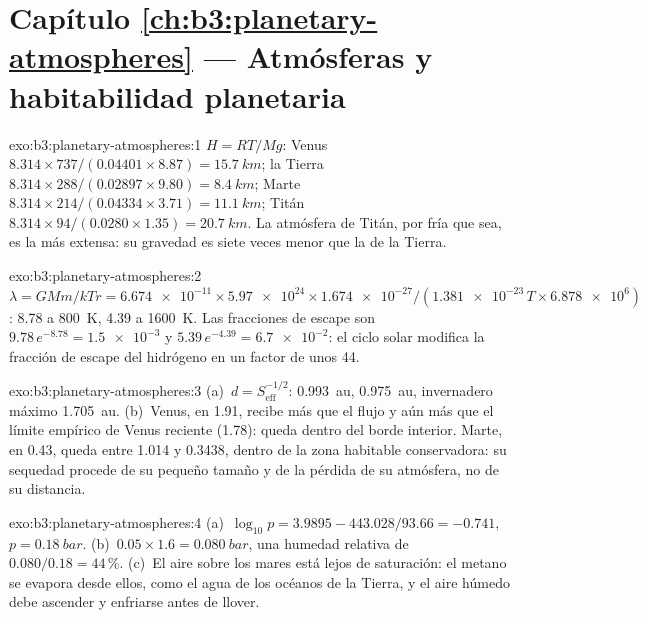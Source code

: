 \section*{Capítulo \ref{ch:b3:planetary-atmospheres} --- Atmósferas y habitabilidad planetaria}

\begin{solution}{exo:b3:planetary-atmospheres:1}
$H = RT/Mg$: Venus $8.314\times737/(0.04401\times8.87) = \qty{15.7}{km}$;
la Tierra $8.314\times288/(0.02897\times9.80) = \qty{8.4}{km}$; Marte
$8.314\times214/(0.04334\times3.71) = \qty{11.1}{km}$; Titán
$8.314\times94/(0.0280\times1.35) = \qty{20.7}{km}$. La atmósfera de Titán,
por fría que sea, es la más extensa: su gravedad es siete veces menor
que la de la Tierra.
\end{solution}

\begin{solution}{exo:b3:planetary-atmospheres:2}
$\lambda = GMm/kTr = \num{6.674e-11}\times\num{5.97e24}\times\num{1.674e-27}
/(\num{1.381e-23}\,T\times\num{6.878e6})$: 8.78 a \qty{800}{K}, 4.39 a
\qty{1600}{K}. Las fracciones de escape son $9.78\,e^{-8.78} =
\num{1.5e-3}$ y $5.39\,e^{-4.39} = \num{6.7e-2}$: el ciclo solar
modifica la fracción de escape del hidrógeno en un factor de unos 44.
\end{solution}

\begin{solution}{exo:b3:planetary-atmospheres:3}
(a)~$d = S_\mathrm{eff}^{-1/2}$:  \qty{0.993}{au},  \qty{0.975}{au}, invernadero máximo \qty{1.705}{au}. (b)~Venus, en 1.91,
recibe más que el flujo  y aún más que el
límite empírico de Venus reciente (1.78): queda dentro del borde interior. Marte, en 0.43,
queda entre 1.014 y 0.3438, dentro de la zona habitable conservadora:
su sequedad procede de su pequeño tamaño y de la pérdida de su atmósfera, no
de su distancia.
\end{solution}

\begin{solution}{exo:b3:planetary-atmospheres:4}
(a)~$\log_{10}p = 3.9895 - 443.028/93.66 = -0.741$, $p =
\qty{0.18}{bar}$. (b)~$0.05\times1.6 = \qty{0.080}{bar}$, una
humedad relativa de $0.080/0.18 = 44\,\%$. (c)~El aire sobre los mares está lejos de
saturación: el metano se evapora desde ellos, como el agua de los
océanos de la Tierra, y el aire húmedo debe ascender y enfriarse antes de llover.
\end{solution}

